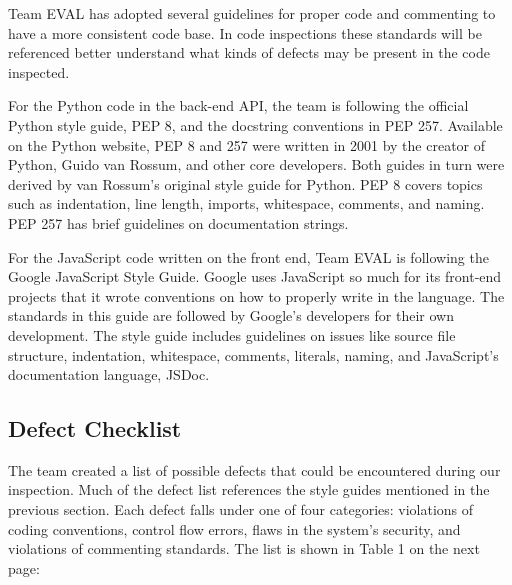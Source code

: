 \documentclass{article}
\begin{document}
Team EVAL has adopted several guidelines for proper code and commenting to have a more consistent code base. In code inspections these standards will be referenced better understand what kinds of defects may be present in the code inspected.

For the Python code in the back-end API, the team is following the official Python style guide, PEP 8, and the docstring conventions in PEP 257. Available on the Python website, PEP 8 and 257 were written in 2001 by the creator of Python, Guido van Rossum, and other core developers. Both guides in turn were derived by van Rossum's original style guide for Python. PEP 8 covers topics such as indentation, line length, imports, whitespace, comments, and naming. PEP 257 has brief guidelines on documentation strings.

For the JavaScript code written on the front end, Team EVAL is following the Google JavaScript Style Guide. Google uses JavaScript so much for its front-end projects that it wrote conventions on how to properly write in the language. The standards in this guide are followed by Google's developers for their own development. The style guide includes guidelines on issues like source file structure, indentation, whitespace, comments, literals, naming, and JavaScript's documentation language, JSDoc. 

\subsection{Defect Checklist}

The team created a list of possible defects that could be encountered during our inspection. Much of the defect list references the style guides mentioned in the previous section. Each defect falls under one of four categories: violations of coding conventions, control flow errors, flaws in the system's security, and violations of commenting standards. The list is shown in Table 1 on the next page:

\vspace{2cm}
\end{document}
